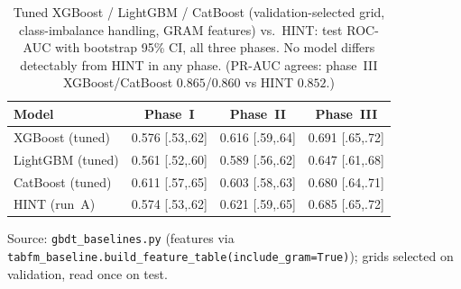 \documentclass[a4paper,fleqn]{cas-sc}
\begin{document}
\begin{table}[t]
\centering\small
\caption{Tuned XGBoost / LightGBM / CatBoost (validation-selected grid, class-imbalance
handling, GRAM features) vs.\ HINT: test ROC-AUC with bootstrap 95\% CI, all three phases.
No model differs detectably from HINT in any phase. (PR-AUC agrees: phase~III XGBoost/CatBoost
$0.865$/$0.860$ vs HINT $0.852$.)}
\label{tab:gbdt}
\begin{tabular}{lccc}
\toprule
Model & Phase~I & Phase~II & Phase~III \\
\midrule
XGBoost (tuned)  & 0.576 {\scriptsize [.53,.62]} & 0.616 {\scriptsize [.59,.64]} & 0.691 {\scriptsize [.65,.72]} \\
LightGBM (tuned) & 0.561 {\scriptsize [.52,.60]} & 0.589 {\scriptsize [.56,.62]} & 0.647 {\scriptsize [.61,.68]} \\
CatBoost (tuned) & 0.611 {\scriptsize [.57,.65]} & 0.603 {\scriptsize [.58,.63]} & 0.680 {\scriptsize [.64,.71]} \\
HINT (run~A)     & 0.574 {\scriptsize [.53,.62]} & 0.621 {\scriptsize [.59,.65]} & 0.685 {\scriptsize [.65,.72]} \\
\bottomrule
\end{tabular}
\begin{minipage}{\linewidth}\vspace{2pt}\scriptsize Source: \texttt{gbdt\_baselines.py} (features via \texttt{tabfm\_baseline.build\_feature\_table(include\_gram=True)}); grids selected on validation, read once on test. \end{minipage}
\end{table}
\end{document}
